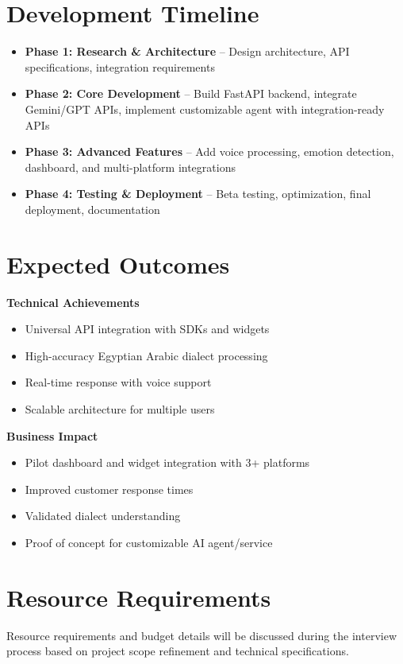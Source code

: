 \documentclass[12pt,a4paper]{article}
\begin{document}
\section*{Development Timeline}
\begin{itemize}
    \item \textbf{Phase 1: Research \& Architecture} – Design architecture, API specifications, integration requirements
    \item \textbf{Phase 2: Core Development} – Build FastAPI backend, integrate Gemini/GPT APIs, implement customizable agent with integration-ready APIs
    \item \textbf{Phase 3: Advanced Features } – Add voice processing, emotion detection, dashboard, and multi-platform integrations
    \item \textbf{Phase 4: Testing \& Deployment} – Beta testing, optimization, final deployment, documentation
\end{itemize}

\section*{Expected Outcomes}
\textbf{Technical Achievements}
\begin{itemize}
    \item Universal API integration with SDKs and widgets
    \item High-accuracy Egyptian Arabic dialect processing
    \item Real-time response with voice support
    \item Scalable architecture for multiple users
\end{itemize}

\textbf{Business Impact}
\begin{itemize}
    \item Pilot dashboard and widget integration with 3+ platforms
    \item Improved customer response times
    \item Validated dialect understanding
    \item Proof of concept for customizable AI agent/service
\end{itemize}

\section*{Resource Requirements}
Resource requirements and budget details will be discussed during the interview process based on project scope refinement and technical specifications.
\end{document}

